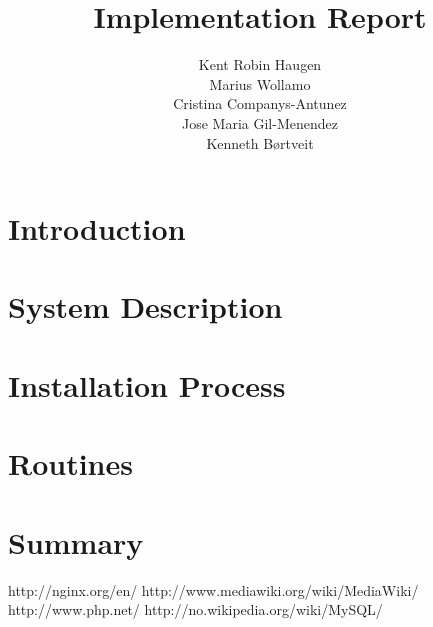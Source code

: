 \documentclass[a4, paper]{article}
\title{Implementation Report}
\author{Kent Robin Haugen \\ Marius Wollamo \\ Cristina Companys-Antunez \\ Jose Maria Gil-Menendez \\ Kenneth Børtveit}
\begin{document}
\maketitle
\section{Introduction}

\section{System Description}

\section{Installation Process}

\section{Routines}

\section{Summary}

\begin{thebibliography}{9}
http://nginx.org/en/
http://www.mediawiki.org/wiki/MediaWiki/
http://www.php.net/
http://no.wikipedia.org/wiki/MySQL/
\end{thebibliography}
\end{document}
